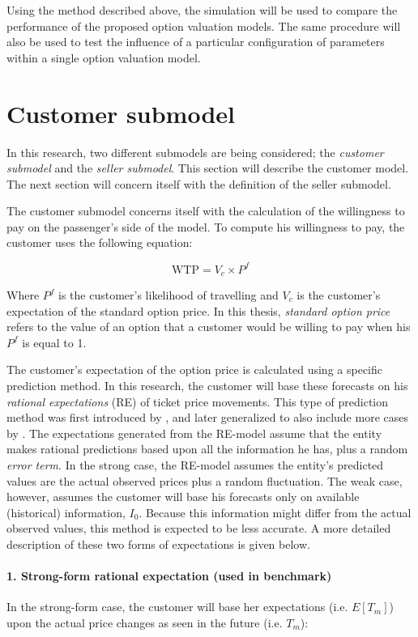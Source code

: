 Using the method described above, the simulation will be used to compare the performance of the proposed option valuation models. The same procedure will also be used to test the influence of a particular configuration of parameters within a single option valuation model.


\section{Customer submodel}
\label{sec:CustomerSubmodel}
In this research, two different submodels are being considered; the \emph{customer submodel} and the \emph{seller submodel}. This section will describe the customer model. The next section will concern itself with the definition of the seller submodel.

The customer submodel concerns itself with the calculation of the willingness to pay on the passenger's side of the model. To compute his willingness to pay, the customer uses the following equation:

$$ \mbox{WTP} = V_c \times P^f $$

Where $P^f$ is the customer's likelihood of travelling and $V_c$ is the customer's expectation of the standard option price. In this thesis, \emph{standard option price} refers to the value of an option that a customer would be willing to pay when his $P^f$ is equal to 1.

The customer's expectation of the option price is calculated using a specific prediction method. In this research, the customer will base these forecasts on his \emph{rational expectations} (RE) of ticket price movements. This type of prediction method was first introduced by , and later generalized to also include more cases by . The expectations generated from the RE-model assume that the entity makes rational predictions based upon all the information he has, plus a random \emph{error term}. In the strong case, the RE-model assumes the entity's predicted values are the actual observed prices plus a random fluctuation. The weak case, however, assumes the customer will base his forecasts only on available (historical) information, $I_0$. Because this information might differ from the actual observed values, this method is expected to be less accurate. A more detailed description of these two forms of expectations is given below.

\paragraph{1. Strong-form rational expectation (used in benchmark)}
In the strong-form case, the customer will base her expectations (i.e. $E[T_m]$) upon the actual price changes as seen in the future (i.e. $T_m$):

